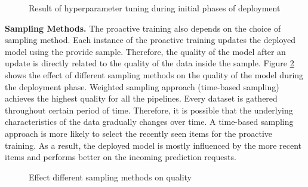 \begin{figure}[!h]
\centering
\resizebox{\columnwidth}{!}{}
\caption{Result of hyperparameter tuning during initial phases of deployment}
\label{hyper-param-figure}
\end{figure}

\textbf{Sampling Methods.}
The proactive training also depends on the choice of sampling method.
Each instance of the proactive training updates the deployed model using the provide sample.
Therefore, the quality of the model after an update is directly related to the quality of the data inside the sample.
Figure \ref{sampling-method-figure} shows the effect of different sampling methods on the quality of the model during the deployment phase.
Weighted sampling approach (time-based sampling) achieves the highest quality for all the pipelines.
Every dataset is gathered throughout certain period of time.
Therefore, it is possible that the underlying characteristics of the data gradually changes over time.
A time-based sampling approach is more likely to select the recently seen items for the proactive training.
As a result, the deployed model is mostly influenced by the more recent items and performs better on the incoming prediction requests.

\begin{figure}[!h]
\centering
\resizebox{\columnwidth}{!}{}
\caption{Effect different sampling methods on quality}
\label{sampling-method-figure}
\end{figure}

